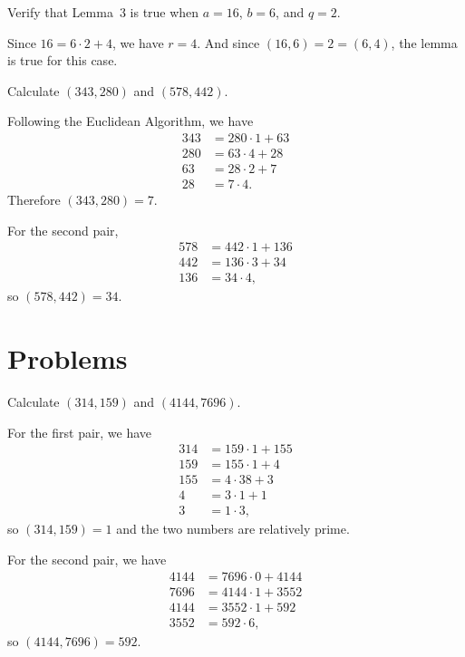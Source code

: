  Verify that Lemma~3 is true when $a = 16$, $b = 6$, and
$q = 2$.
\begin{solution}
  Since $16 = 6\cdot2 + 4$, we have $r = 4$. And since
  $(16,6) = 2 = (6,4)$, the lemma is true for this case.
\end{solution}

 Calculate $(343, 280)$ and $(578, 442)$.
\begin{solution}
  Following the Euclidean Algorithm, we have
  \begin{align*}
    343 &= 280\cdot1 + 63 \\
    280 &= 63\cdot4 + 28 \\
    63 &= 28\cdot2 + 7 \\
    28 &= 7\cdot4.
  \end{align*}
  Therefore $(343, 280) = 7$.

  For the second pair,
  \begin{align*}
    578 &= 442\cdot1 + 136 \\
    442 &= 136\cdot3 + 34 \\
    136 &= 34\cdot4,
  \end{align*}
  so $(578,442) = 34$.
\end{solution}

\section{Problems}

 Calculate $(314, 159)$ and $(4144, 7696)$.
\begin{solution}
  For the first pair, we have
  \begin{align*}
    314 &= 159\cdot1 + 155 \\
    159 &= 155\cdot1 + 4 \\
    155 &= 4\cdot38 + 3 \\
    4 &= 3\cdot1 + 1 \\
    3 &= 1\cdot3,
  \end{align*}
  so $(314, 159) = 1$ and the two numbers are relatively prime.

  For the second pair, we have
  \begin{align*}
    4144 &= 7696\cdot0 + 4144 \\
    7696 &= 4144\cdot1 + 3552 \\
    4144 &= 3552\cdot1 + 592 \\
    3552 &= 592\cdot6,
  \end{align*}
  so $(4144, 7696) = 592$.
\end{solution}

